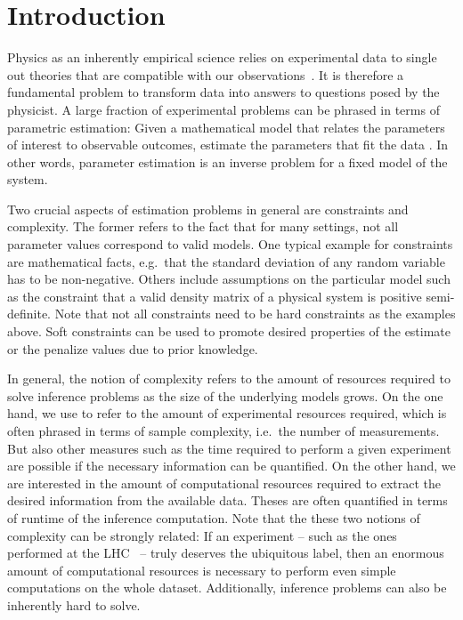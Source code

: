 
\chapter{Introduction}%
\label{chap:introduction}


Physics as an inherently empirical science relies on experimental data to single out theories that are compatible with our observations~\cite{Popper}.
It is therefore a fundamental problem to transform data into answers to questions posed by the physicist.
A large fraction of experimental problems can be phrased in terms of parametric estimation:
Given a mathematical model that relates the parameters of interest to observable outcomes, estimate the parameters that fit the data .
In other words, parameter estimation is an inverse problem for a fixed model of the system.

Two crucial aspects of estimation problems in general are constraints and complexity.
The former refers to the fact that for many settings, not all parameter values correspond to valid models.
One typical example for constraints are mathematical facts, e.g.\ that the standard deviation of any random variable has to be non-negative.
Others include assumptions on the particular model such as the constraint that a valid density matrix of a physical system is positive semi-definite.
Note that not all constraints need to be hard constraints as the examples above.
Soft constraints can be used to promote desired properties of the estimate or the penalize values due to prior knowledge.

In general, the notion of complexity refers to the amount of resources required to solve inference problems as the size of the underlying models grows.
On the one hand, we use  to refer to the amount of experimental resources required, which is often phrased in terms of sample complexity, i.e.\ the number of measurements.
But also other measures such as the time required to perform a given experiment are possible if the necessary information can be quantified.
On the other hand, we are interested in the amount of computational resources required to extract the desired information from the available data.
Theses are often quantified in terms of runtime of the inference computation.
Note that the these two notions of complexity can be strongly related:
If an experiment -- such as the ones performed at the LHC~\cite{} -- truly deserves the ubiquitous  label, then an enormous amount of computational resources is necessary to perform even simple computations on the whole dataset.
Additionally, inference problems can also be inherently hard to solve.\\



